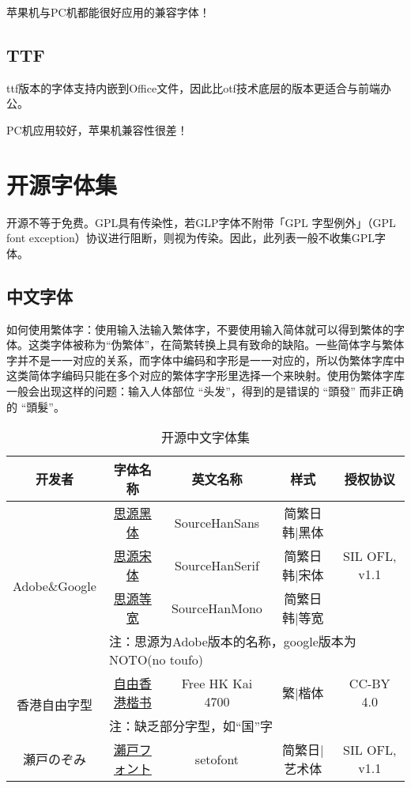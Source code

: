 \documentclass[11pt,a4paper,UTF8,titlepage]{ctexart} %
\begin{document}
    苹果机与PC机都能很好应用的兼容字体！

    \subsection{TTF}
    ttf版本的字体支持内嵌到Office文件，因此比otf技术底层的版本更适合与前端办公。

    PC机应用较好，苹果机兼容性很差！

    \section{开源字体集}
    开源不等于免费。GPL具有传染性，若GLP字体不附带「GPL 字型例外」（GPL font exception）协议进行阻断，则视为传染。因此，此列表一般不收集GPL字体。

    \subsection{中文字体}
    如何使用繁体字：使用输入法输入繁体字，不要使用输入简体就可以得到繁体的字体。这类字体被称为“伪繁体”，在简繁转换上具有致命的缺陷。一些简体字与繁体字并不是一一对应的关系，而字体中编码和字形是一一对应的，所以伪繁体字库中这类简体字编码只能在多个对应的繁体字字形里选择一个来映射。使用伪繁体字库一般会出现这样的问题：输入人体部位 “头发”，得到的是错误的 “頭發” 而非正确的 “頭髮”。

    \begin{table}[h]
        \centering \caption{开源中文字体集}
        \begin{tabular}{|*{5}{c|}}
            \hline
            开发者 & 字体名称 & 英文名称 & 样式 & 授权协议 \\
            \hline
            \multirow{4}{*}{Adobe\&Google} & \href{https://github.com/adobe-fonts/source-han-sans/tree/release/}{思源黑体} & SourceHanSans & 简繁日韩|黑体 & \multirow{3}{*}{SIL OFL, v1.1} \\
            \cline{2-4}
            & \href{https://github.com/adobe-fonts/source-han-serif/tree/release/}{思源宋体} & SourceHanSerif & 简繁日韩|宋体 & \\
            \cline{2-4}
            & \href{https://github.com/adobe-fonts/source-han-mono}{思源等宽} & SourceHanMono & 简繁日韩|等宽 & \\
            \cline{2-5}
            & \multicolumn{4}{l|}{注：思源为Adobe版本的名称，google版本为NOTO(no toufo)} \\
            \hline
            \multirow{2}{*}{香港自由字型} & \href{https://freehkfonts.opensource.hk/download/}{自由香港楷书} & Free HK Kai 4700 & 繁|楷体 & CC-BY 4.0 \\
            \cline{2-5}
            & \multicolumn{4}{l|}{注：缺乏部分字型，如“国”字} \\
            \hline
            瀬戸のぞみ & \href{https://osdn.net/projects/setofont/}{瀨戸フォント} & setofont & 简繁日|艺术体 & SIL OFL, v1.1 \\
            \hline
        \end{tabular}
    \end{table}
\end{document}
